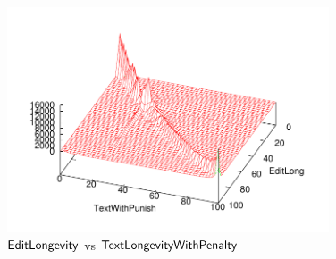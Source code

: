 %
\begin{figure}[tbhp]
    \begin{center}
    \includegraphics[width=0.85\textwidth]{part-I10-contrib/graphs/prct-editlong-textwithpunish}
    \end{center}
    \caption[Comparing edit longevity with the punishing function]{
    	$\editlong$ vs $\punish$
    }
    \label{fig-prct-editlong-textwithpunish}
\end{figure}
%

